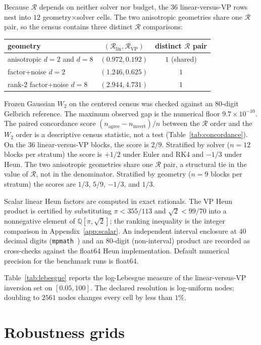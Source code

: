 \documentclass[11pt,a4paper]{article}
\newcommand{\numRlinAniso}{0.972}
\newcommand{\numRvpAniso}{0.192}
\newcommand{\numRlinLowTwo}{1.246}
\newcommand{\numRvpLowTwo}{0.625}
\newcommand{\numRlinStrong}{2.944}
\newcommand{\numRvpStrong}{4.731}
\newcommand{\numPrecFloor}{9.7\times 10^{-10}}
\theoremstyle{remark}
\newcommand{\wtwo}{W_2}
\newcommand{\cR}{\mathcal{R}}
\begin{document}
Because $\cR$ depends on neither solver nor budget, the $36$ linear-versus-VP
rows nest into $12$ geometry$\times$solver cells. The two anisotropic
geometries share one $\cR$ pair, so the census contains three distinct
$\cR$ comparisons:
{\centering
\small
\begin{tabular}{lcc}
\toprule
geometry & $(\cR_{\mathrm{lin}},\cR_{\mathrm{VP}})$ & distinct $\cR$ pair \\
\midrule
anisotropic $d=2$ and $d=8$ & $(\numRlinAniso,\numRvpAniso)$ & $1$ (shared) \\
factor+noise $d=2$ & $(\numRlinLowTwo,\numRvpLowTwo)$ & $1$ \\
rank-2 factor+noise $d=8$ & $(\numRlinStrong,\numRvpStrong)$ & $1$ \\
\bottomrule
\end{tabular}\par}

Frozen Gaussian $\wtwo$ on the centered census was checked against an
$80$-digit Gelbrich reference. The maximum observed gap is the numerical
floor $\numPrecFloor$. The paired concordance score
$(n_{\mathrm{agree}}-n_{\mathrm{invert}})/n$ between the $\cR$ order and the
$\wtwo$ order is a descriptive census statistic, not a test
(Table~\ref{tab:concordance}). On the $36$ linear-versus-VP blocks,
the score is $2/9$. Stratified by solver ($n=12$ blocks per stratum) the
score is $+1/2$ under Euler and RK4 and $-1/3$ under Heun. The two
anisotropic geometries share one $\cR$ pair, a structural tie in the
value of $\cR$, not in the denominator. Stratified by geometry
($n=9$ blocks per stratum) the scores are $1/3$, $5/9$, $-1/3$, and
$1/3$.

Scalar linear Heun factors are computed in exact rationals. The VP Heun
product is certified by substituting $\pi<355/113$ and $\sqrt{2}<99/70$ into
a nonnegative element of $\mathbb{Q}[\pi,\sqrt{2}]$; the ranking inequality
is the integer comparison in Appendix~\ref{app:scalar}. An independent
interval enclosure at $40$ decimal digits
(\texttt{mpmath}~\mpmathVersion) and an $80$-digit (non-interval) product
are recorded as cross-checks against the float64 Heun implementation.
Default numerical precision for the benchmark runs is float64.

Table~\ref{tab:lebesgue} reports the log-Lebesgue measure of the
linear-versus-VP inversion set on $[0.05,100]$. The declared resolution is
\logLebesgueNodes{} log-uniform nodes; doubling to $2561$ nodes changes
every cell by less than $1\%$.

\section{Robustness grids}
\label{app:robust}
\end{document}
